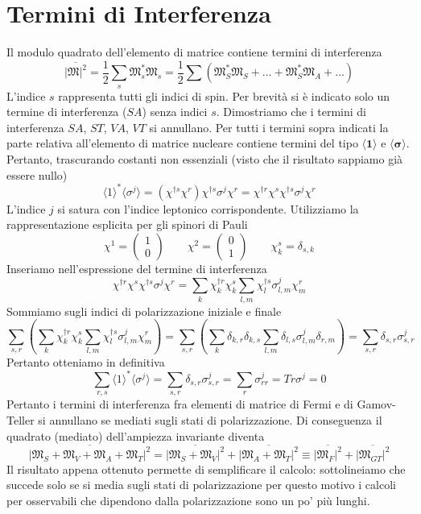 \section{Termini di Interferenza}
Il modulo quadrato dell'elemento di matrice contiene termini di interferenza
$$
\overline{|\mathfrak{M}|^2} = \frac{1}{2} \sum_s \mathfrak{M}_s^* \mathfrak{M}_s = \frac{1}{2} \sum (\mathfrak{M}_S^* \mathfrak{M}_S + \dots + \mathfrak{M}_S^* \mathfrak{M}_A + \dots)
$$
L'indice $s$ rappresenta tutti gli indici di spin. Per brevità si è indicato solo un termine di interferenza ($SA$) senza indici $s$. Dimostriamo che i termini di interferenza $SA$, $ST$, $VA$, $VT$ si annullano. Per tutti i termini sopra indicati la parte relativa all'elemento di matrice nucleare contiene termini del tipo $\langle\mathbf{1}\rangle$ e $\langle\boldsymbol {\sigma}\rangle$. Pertanto, trascurando costanti non essenziali (visto che il risultato sappiamo già essere nullo)
$$
\langle 1 \rangle^* \langle \sigma^j \rangle = (\chi^{\dagger s} \chi^r) \chi^{\dagger s} \sigma^j \chi^r = \chi^{\dagger r} \chi^s \chi^{\dagger s} \sigma^j \chi^r
$$
L'indice $j$ si satura con l'indice leptonico corrispondente. Utilizziamo la rappresentazione esplicita per gli spinori di Pauli
$$
\chi^1 = \begin{pmatrix} 1 \\ 0 \end{pmatrix} \qquad \chi^2 = \begin{pmatrix} 0 \\ 1 \end{pmatrix} \qquad \chi_k^s = \delta_{s,k}
$$
Inseriamo nell'espressione del termine di interferenza
$$
\chi^{\dagger r} \chi^s \chi^{\dagger s} \sigma^j \chi^r = \sum_k \chi_k^{\dagger r} \chi_k^s \sum_{l,m} \chi_l^{\dagger s} \sigma^j_{l,m} \chi_m^r
$$
Sommiamo sugli indici di polarizzazione iniziale e finale
$$
\sum_{s,r} \left( \sum_k \chi_k^{\dagger r} \chi_k^s \sum_{l,m} \chi_l^{\dagger s} \sigma^j_{l,m} \chi_m^r \right) = \sum_{s,r} \left( \sum_k \delta_{k,r} \delta_{k,s} \sum_{l,m} \delta_{l,s} \sigma^j_{l,m} \delta_{r,m} \right) = \sum_{s,r} \delta_{s,r} \sigma^j_{s,r}
$$
Pertanto otteniamo in definitiva
$$
\sum_{r,s} \langle 1 \rangle^* \langle \sigma^j \rangle = \sum_{s,r} \delta_{s,r} \sigma^j_{s,r} = \sum_r \sigma^j_{rr} = Tr\sigma^j = 0
$$
Pertanto i termini di interferenza fra elementi di matrice di Fermi e di Gamov-Teller si annullano se mediati sugli stati di polarizzazione. Di conseguenza il quadrato (mediato) dell'ampiezza invariante diventa
$$
\overline{|\mathfrak{M}_S + \mathfrak{M}_V + \mathfrak{M}_A + \mathfrak{M}_T|^2} = \overline{|\mathfrak{M}_S + \mathfrak{M}_V|^2} + \overline{|\mathfrak{M}_A + \mathfrak{M}_T|^2} \equiv \overline{|\mathfrak{M}_F|^2} + \overline{|\mathfrak{M}_{GT}|^2}
$$
Il risultato appena ottenuto permette di semplificare il calcolo: sottolineiamo che succede solo se si media sugli stati di polarizzazione per questo motivo i calcoli per osservabili che dipendono dalla polarizzazione sono un po' più lunghi.

